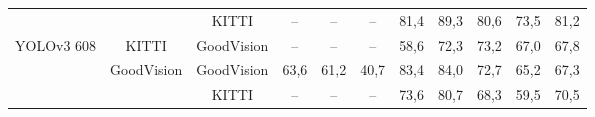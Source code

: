 \documentclass[twoside]{ctuthesis}
\theoremstyle{plain}
\theoremstyle{definition}
\theoremstyle{note}
\begin{document}
\begin{table}
{\begin{tabular}{|c|c|c|c|c|c|c|c|c|c|c|}
                                                         &                                                                     & KITTI                                                              & --                                                                     & --                                                                 & --                                                                        & 81,4                                                               & 89,3                                                                  & 80,6                                                                 & 73,5                                                               & 81,2                                                            \\ \cline{3-11} 
\multirow{-3}{*}{YOLOv3 608}                             & \multirow{-2}{*}{KITTI}                                             & GoodVision                                                         & --                                                                     & --                                                                 & --                                                                        & 58,6                                                               & 72,3                                                                  & 73,2                                                                 & 67,0                                                               & 67,8                                                            \\ \hline
                                                         & GoodVision                                                          & GoodVision                                                         & 63,6                                                                   & 61,2                                                               & 40,7                                                                      & 83,4                                                               & 84,0                                                                  & 72,7                                                                 & 65,2                                                               & 67,3                                                            \\ \cline{2-11} 
                                                         &                                                                     & KITTI                                                              & --                                                                     & --                                                                 & --                                                                        & 73,6                                                               & 80,7                                                                  & 68,3                                                                 & 59,5                                                               & 70,5                                                            \\ \cline{3-11} 

\end{tabular}}
\end{table}
\end{document}
